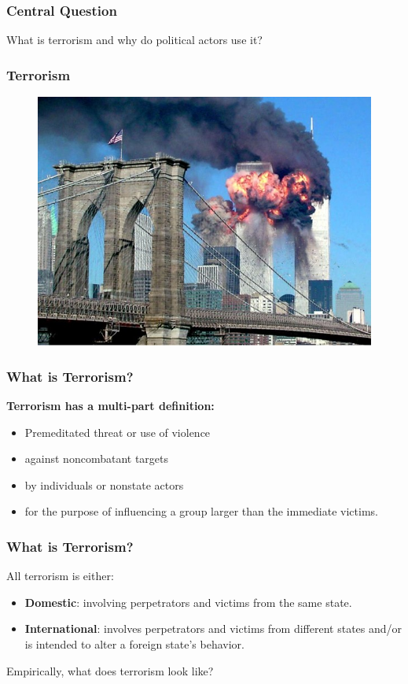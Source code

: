 \documentclass{beamer}
\begin{document}
\begin{frame} 
	\frametitle{\LARGE{Central Question}}
    \centering
    \Large{What is terrorism and why do political actors use it?} 
\end{frame}


\begin{frame} 
	\frametitle{\LARGE{Terrorism}}
	\begin{figure}[ht!]
		\centering
		\includegraphics[width=\textwidth,height=.9\textheight,keepaspectratio]{911.jpg}
	\end{figure}
\end{frame}

\begin{frame} 
\frametitle{\LARGE{What is Terrorism?}}
\textbf{Terrorism has a multi-part definition:}
\begin{itemize}
		\item Premeditated threat or use of violence \pause
		\item against noncombatant targets \pause
		\item by individuals or nonstate actors \pause
		\item for the purpose of influencing a group larger than the immediate victims.
\end{itemize}
\end{frame}

\begin{frame} 
	\frametitle{\LARGE{What is Terrorism?}}
All terrorism is either:
	\begin{itemize}
		\item \textbf{Domestic}: involving perpetrators and victims from the same state. \pause
		\item \textbf{International}: involves perpetrators and victims from different states and/or is intended to alter a foreign state's behavior. \pause
	\end{itemize}
Empirically, what does terrorism look like?
\end{frame}
\end{document}
